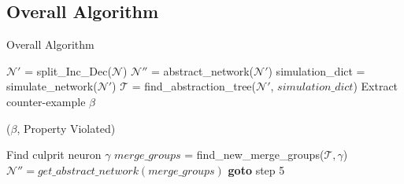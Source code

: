 \subsection{Overall Algorithm}
\begin{algorithm}[H]
    \caption{Overall Algorithm}
    \label{Overall Algorithm}
    \begin{algorithmic}[1]
        \State $\mathcal{N'}$ = split\_Inc\_Dec($\mathcal{N}$)
        \State $\mathcal{N''}$ = abstract\_network($\mathcal{N'}$)
        \State simulation\_dict = simulate\_network($\mathcal{N'}$)
        \State $\mathcal{T}$ = find\_abstraction\_tree($\mathcal{N'}$, $simulation\_dict$)
        \Else
            \State Extract counter-example $\beta$
            {

                \Return ($\beta$, Property Violated)
            }
            \Else
                \State Find culprit neuron $\gamma$
                \State $merge\_groups$ = find\_new\_merge\_groups($\mathcal{T, \gamma}$)
                \State $\mathcal{N''} = get\_abstract\_network(merge\_groups)$
                \State \textbf{goto} step 5
            \EndIf
        \EndIf
    \end{algorithmic}
\end{algorithm}
